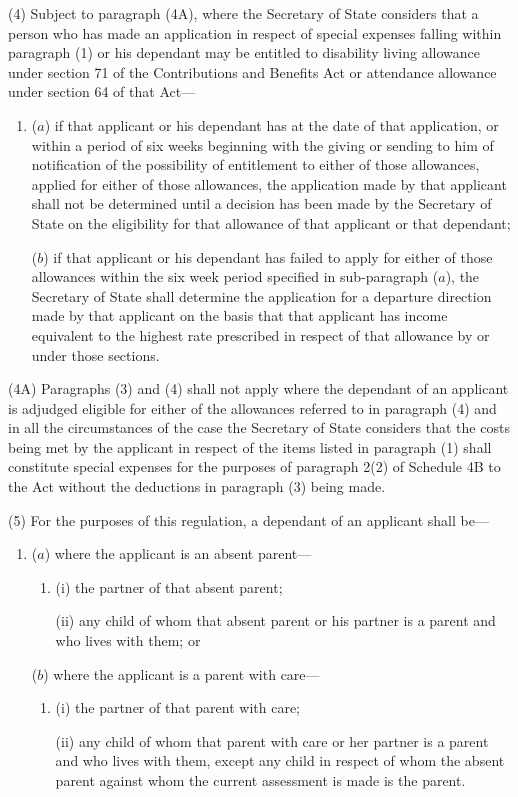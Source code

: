 \documentclass[12pt,a4paper]{article}
\begin{document}
(4) 
Subject to paragraph (4A),  %
where the Secretary of State considers that a person who has made an application in respect of special expenses falling within paragraph (1) or his dependant may be entitled to disability living allowance under section 71 of the Contributions and Benefits Act or attendance allowance under section 64 of that Act—
\begin{enumerate}\item[]
($a$) if that applicant or his dependant has at the date of that application, or within a period of six weeks beginning with the giving or sending to him of notification of the possibility of entitlement to either of those allowances, applied for either of those allowances, the application made by that applicant shall not be determined until a decision has been made by the 
Secretary of State  %
on the eligibility for that allowance of that applicant or that dependant;

($b$) if that applicant or his dependant has failed to apply for either of those
allowances within the six week period specified in sub-paragraph ($a$), the
Secretary of State shall determine the application for a departure direction
made by that applicant on the basis that that applicant has income equivalent to
the highest rate prescribed in respect of that allowance by or under those
sections.
\end{enumerate}

(4A) Paragraphs (3) and (4) shall not apply where the dependant of an applicant is adjudged eligible for either of the allowances referred to in paragraph (4) and in all the circumstances of the case the Secretary of State considers that the costs being met by the applicant in respect of the items listed in paragraph (1) shall constitute special expenses for the purposes of paragraph 2(2) of Schedule 4B to the Act without the deductions in paragraph (3) being made.

(5) For the purposes of this regulation, a dependant of an applicant shall be—
\begin{enumerate}\item[]
($a$) where the applicant is an absent parent—
\begin{enumerate}\item[]
(i) the partner of that absent parent;

(ii) any child of whom that absent parent or his partner is a parent and who
lives with them; or
\end{enumerate}

($b$) where the applicant is a parent with care—
\begin{enumerate}\item[]
(i) the partner of that parent with care;

(ii) any child of whom that parent with care or her partner is a parent and who
lives with them, except any child in respect of whom the absent parent against
whom the current assessment is made is the parent.
\end{enumerate}
\end{enumerate}
\end{document}
